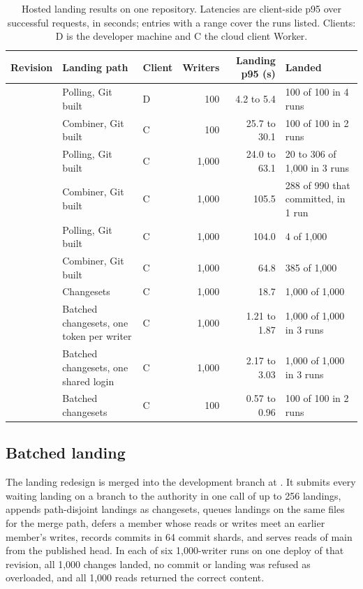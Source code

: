 \documentclass[11pt,letterpaper]{article}
\theoremstyle{definition}
\theoremstyle{remark}
\begin{document}
\begin{table}[t]
\centering
\small
\caption{Hosted landing results on one repository. Latencies are client-side p95 over successful requests, in seconds; entries with a range cover the runs listed. Clients: D is the developer machine and C the cloud client Worker.}
\label{tab:syn:landing}
\begin{tabularx}{\textwidth}{@{}L{1.6cm}L{4.0cm}lrrY@{}}
\toprule
Revision & Landing path & Client & Writers & Landing p95 (s) & Landed \\
\midrule
{} & Polling, Git built & D & 100 & 4.2 to 5.4 & 100 of 100 in 4 runs \\ %
 & Combiner, Git built & C & 100 & 25.7 to 30.1 & 100 of 100 in 2 runs \\ %
 & Polling, Git built & C & 1,000 & 24.0 to 63.1 & 20 to 306 of 1,000 in 3 runs \\ %
 & Combiner, Git built & C & 1,000 & 105.5 & 288 of 990 that committed, in 1 run \\ %
\midrule
{} & Polling, Git built & C & 1,000 & 104.0 & 4 of 1,000 \\ %
 & Combiner, Git built & C & 1,000 & 64.8 & 385 of 1,000 \\ %
 & Changesets & C & 1,000 & 18.7 & 1,000 of 1,000 \\ %
\midrule
{} & Batched changesets, one token per writer & C & 1,000 & 1.21 to 1.87 & 1,000 of 1,000 in 3 runs \\ %
 & Batched changesets, one shared login & C & 1,000 & 2.17 to 3.03 & 1,000 of 1,000 in 3 runs \\ %
 & Batched changesets & C & 100 & 0.57 to 0.96 & 100 of 100 in 2 runs \\ %
\bottomrule
\end{tabularx}
\end{table}

\subsection{Batched landing}
\label{sec:syn:batch}

The landing redesign is merged into the development branch at . It submits every waiting landing on a branch to the authority in one call of up to 256 landings, appends path-disjoint landings as changesets, queues landings on the same files for the merge path, defers a member whose reads or writes meet an earlier member's writes, records commits in 64 commit shards, and serves reads of main from the published head. %
 In each of six 1,000-writer runs on one deploy of that revision, all 1,000 changes landed, no commit or landing was refused as overloaded, and all 1,000 reads returned the correct content. %
\end{document}
